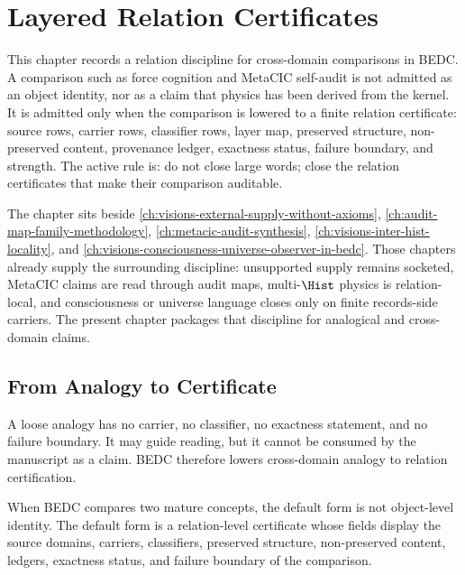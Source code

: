 \chapter{Layered Relation Certificates}
\label{ch:visions-layered-relation-certificate}

This chapter records a relation discipline for cross-domain comparisons in BEDC. A comparison such as force cognition and MetaCIC self-audit is not admitted as an object identity, nor as a claim that physics has been derived from the kernel. It is admitted only when the comparison is lowered to a finite relation certificate: source rows, carrier rows, classifier rows, layer map, preserved structure, non-preserved content, provenance ledger, exactness status, failure boundary, and strength. The active rule is: do not close large words; close the relation certificates that make their comparison auditable.

The chapter sits beside \autoref{ch:visions-external-supply-without-axioms}, \autoref{ch:audit-map-family-methodology}, \autoref{ch:metacic-audit-synthesis}, \autoref{ch:visions-inter-hist-locality}, and \autoref{ch:visions-consciousness-universe-observer-in-bedc}. Those chapters already supply the surrounding discipline: unsupported supply remains socketed, MetaCIC claims are read through audit maps, multi-$\Hist$ physics is relation-local, and consciousness or universe language closes only on finite records-side carriers. The present chapter packages that discipline for analogical and cross-domain claims.

\section{From Analogy to Certificate}
\label{sec:layered-relation-from-analogy-to-certificate}

A loose analogy has no carrier, no classifier, no exactness statement, and no failure boundary. It may guide reading, but it cannot be consumed by the manuscript as a claim. BEDC therefore lowers cross-domain analogy to relation certification.

\begin{principle}
\label{prin:layered-relation-before-identity}
When BEDC compares two mature concepts, the default form is not object-level identity. The default form is a relation-level certificate whose fields display the source domains, carriers, classifiers, preserved structure, non-preserved content, ledgers, exactness status, and failure boundary of the comparison.
\end{principle}

